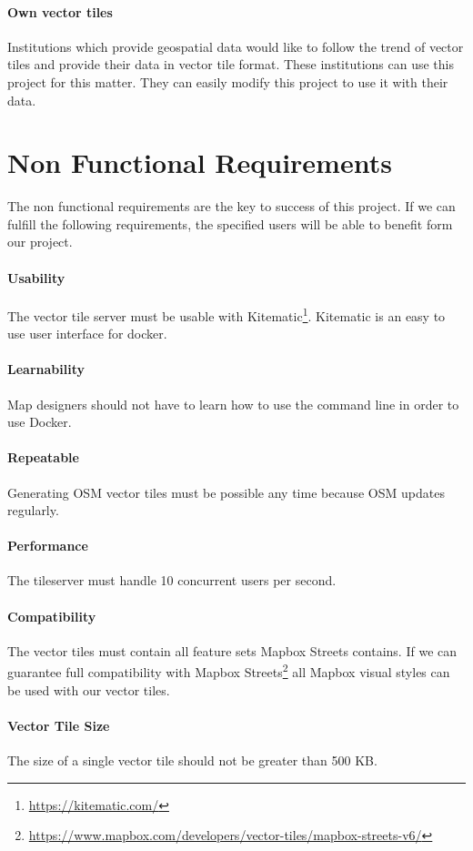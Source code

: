 \paragraph{Own vector tiles}
Institutions which provide geospatial data would like to follow the trend of vector tiles and provide their data in vector tile format. These institutions can use this project for this matter. They can easily modify this project to use it with their data. 

\section{Non Functional Requirements}\label{non_functional_requirements}

The non functional requirements are the key to success of this project. If we can fulfill the following requirements, the specified users will be able to benefit form our project.

\paragraph{Usability}
The vector tile server must be usable with Kitematic\footnote{\url{https://kitematic.com/}}. Kitematic is an easy to use user interface for docker. 

\paragraph{Learnability}

Map designers should not have to learn how to use the command line in
order to use Docker.

\paragraph{Repeatable}

Generating OSM vector tiles must be possible any time because OSM
updates regularly.

\paragraph{Performance}

The tileserver must handle 10 concurrent users per second.

\paragraph{Compatibility}

The vector tiles must contain all feature sets Mapbox Streets contains. If we can guarantee full compatibility with Mapbox Streets\footnote{\url{https://www.mapbox.com/developers/vector-tiles/mapbox-streets-v6/}} all Mapbox visual styles can be used with our vector tiles.

\paragraph{Vector Tile Size}

The size of a single vector tile should not be greater than 500 KB.
